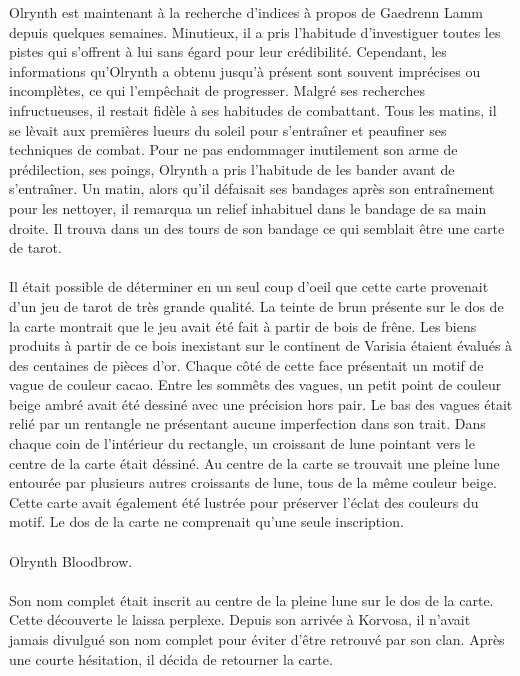 \documentclass[main.tex]{subfiles}
\begin{document}
    Olrynth est maintenant à la recherche d'indices à propos de Gaedrenn Lamm depuis quelques semaines.
    Minutieux, il a pris l'habitude d'investiguer toutes les pistes qui s'offrent à lui sans égard pour leur crédibilité.
    Cependant, les informations qu'Olrynth a obtenu jusqu'à présent sont souvent imprécises ou incomplètes, ce qui l'empêchait de progresser.
    Malgré ses recherches infructueuses, il restait fidèle à ses habitudes de combattant.
    Tous les matins, il se lèvait aux premières lueurs du soleil pour s'entraîner et peaufiner ses techniques de combat.
    Pour ne pas endommager inutilement son arme de prédilection, ses poings, Olrynth a pris l'habitude de les bander avant de s'entraîner.
    Un matin, alors qu'il défaisait ses bandages après son entraînement pour les nettoyer, il remarqua un relief inhabituel dans le bandage de sa main droite.
    Il trouva dans un des tours de son bandage ce qui semblait être une carte de tarot.\\
    \\
    Il était possible de déterminer en un seul coup d'oeil que cette carte provenait d'un jeu de tarot de très grande qualité.
    La teinte de brun présente sur le dos de la carte montrait que le jeu avait été fait à partir de bois de frêne.
    Les biens produits à partir de ce bois inexistant sur le continent de Varisia étaient évalués à des centaines de pièces d'or.
    Chaque côté de cette face présentait un motif de vague de couleur cacao.
    Entre les sommêts des vagues, un petit point de couleur beige ambré avait été dessiné avec une précision hors pair.
    Le bas des vagues était relié par un rentangle ne présentant aucune imperfection dans son trait.
    Dans chaque coin de l'intérieur du rectangle, un croissant de lune pointant vers le centre de la carte était déssiné.
    Au centre de la carte se trouvait une pleine lune entourée par plusieurs autres croissants de lune, tous de la même couleur beige.
    Cette carte avait également été lustrée pour préserver l'éclat des couleurs du motif.
    Le dos de la carte ne comprenait qu'une seule inscription.\\
    \\
    Olrynth Bloodbrow.\\
    \\
    Son nom complet était inscrit au centre de la pleine lune sur le dos de la carte.
    Cette découverte le laissa perplexe.
    Depuis son arrivée à Korvosa, il n'avait jamais divulgué son nom complet pour éviter d'être retrouvé par son clan.
    Après une courte hésitation, il décida de retourner la carte.
\end{document}
